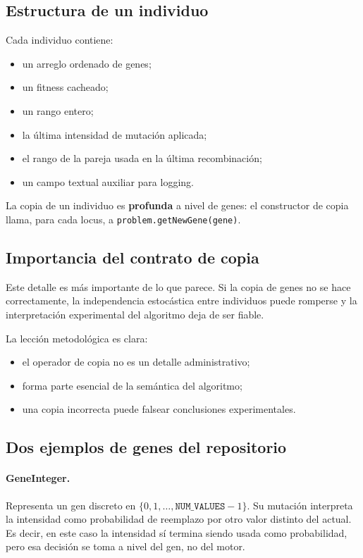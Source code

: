 \documentclass[11pt]{article}
\begin{document}
\subsection{Estructura de un individuo}

Cada individuo contiene:

\begin{itemize}
  \item un arreglo ordenado de genes;
  \item un fitness cacheado;
  \item un rango entero;
  \item la \'ultima intensidad de mutaci\'on aplicada;
  \item el rango de la pareja usada en la \'ultima recombinaci\'on;
  \item un campo textual auxiliar para logging.
\end{itemize}

La copia de un individuo es \textbf{profunda} a nivel de genes: el constructor
de copia llama, para cada locus, a \texttt{problem.getNewGene(gene)}.

\subsection{Importancia del contrato de copia}

Este detalle es m\'as importante de lo que parece. Si la copia de genes no se
hace correctamente, la independencia estoc\'astica entre individuos puede
romperse y la interpretaci\'on experimental del algoritmo deja de ser fiable.

La lecci\'on metodol\'ogica es clara:

\begin{itemize}
  \item el operador de copia no es un detalle administrativo;
  \item forma parte esencial de la sem\'antica del algoritmo;
  \item una copia incorrecta puede falsear conclusiones experimentales.
\end{itemize}

\subsection{Dos ejemplos de genes del repositorio}

\paragraph{GeneInteger.}
Representa un gen discreto en
\(\{0,1,\dots,\texttt{NUM\_VALUES}-1\}\). Su mutaci\'on interpreta la intensidad
como probabilidad de reemplazo por otro valor distinto del actual. Es decir, en
este caso la intensidad s\'i termina siendo usada como probabilidad, pero esa
decisi\'on se toma a nivel del gen, no del motor.
\end{document}
